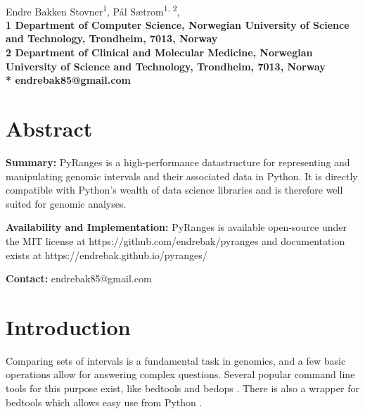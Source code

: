 \documentclass[10pt,letterpaper]{article}
\begin{document}
\vspace*{0.35in}

\begin{flushleft}
{\Large
  \textbf{}
}
\newline
\\
Endre Bakken Stovner\textsuperscript{1},
Pål Sætrom\textsuperscript{1, 2},
\\
\bf{1} Department of
  Computer Science, Norwegian University
  of Science and Technology, Trondheim, 7013, Norway
\\
\bf{2} Department of Clinical and Molecular Medicine, Norwegian
  University of Science and Technology, Trondheim, 7013, Norway
\\
\bigskip
* endrebak85@gmail.com

\end{flushleft}

\section*{Abstract}

\textbf{Summary:} PyRanges is a high-performance datastructure for representing
and manipulating genomic intervals and their associated data in Python. It is
directly compatible with Python's wealth of data science libraries and is
therefore well suited for genomic analyses.

\textbf{Availability and Implementation:} PyRanges is available open-source under
the MIT license at https://github.com/endrebak/pyranges and documentation exists
at https://endrebak.github.io/pyranges/

\textbf{Contact:} endrebak85@gmail.com

\section*{Introduction}


Comparing sets of intervals is a fundamental task in genomics, and a few basic
operations allow for answering complex questions. Several popular command
line tools for this purpose exist, like bedtools
\cite{doi:10.1093/bioinformatics/btq033} and bedops
\cite{doi:10.1093/bioinformatics/bts277}. There is also a wrapper for bedtools
which allows easy use from Python \cite{doi:10.1093/bioinformatics/btr539}.
\end{document}
